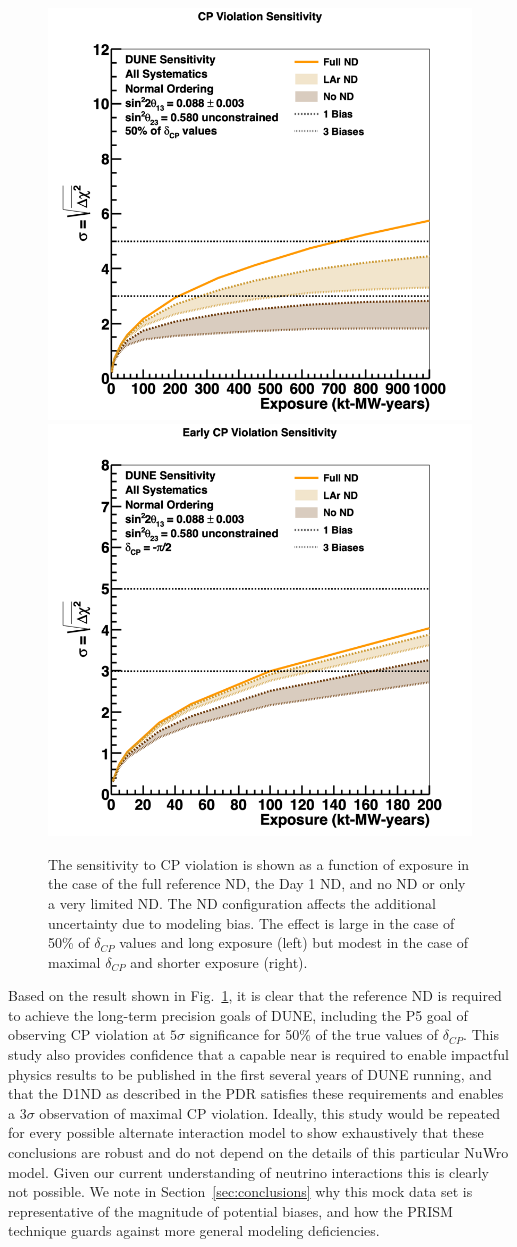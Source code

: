 \documentclass[11pt]{article}
\begin{document}
\begin{figure}[h]
\centering
\includegraphics[width=0.45\columnwidth]{graphics/cpv_exp_nuwrobias_nd_50pc_2019_v4.png}
\includegraphics[width=0.45\columnwidth]{graphics/cpv_exp_nuwrobias_ndearly_max_2019_v4.png}
\caption{The sensitivity to CP violation is shown as a function of exposure in the case of the full reference ND, the Day 1 ND, and no ND or only a very limited ND. The ND configuration affects the additional uncertainty due to modeling bias. The effect is large in the case of 50\% of $\delta_{CP}$ values and long exposure (left) but modest in the case of maximal $\delta_{CP}$ and shorter exposure (right).}
\label{fig:nuwro_sens}
\end{figure}

Based on the result shown in Fig.~\ref{fig:nuwro_sens}, it is clear that the reference ND is required to achieve the long-term precision goals of DUNE, including the P5 goal of observing CP violation at $5 \sigma$ significance for 50\% of the true values of $\delta_{CP}$. This study also provides confidence that a capable near is required to enable impactful physics results to be published in the first several years of DUNE running, and that the D1ND as described in the PDR satisfies these requirements and enables a $3 \sigma$ observation of maximal CP violation. Ideally, this study would be repeated for every possible alternate interaction model to show exhaustively that these conclusions are robust and do not depend on the details of this particular NuWro model. Given our current understanding of neutrino interactions this is clearly not possible. We note in Section~\ref{sec:conclusions} why this mock data set is representative of the magnitude of potential biases, and how the PRISM technique guards against more general modeling deficiencies.
\end{document}
